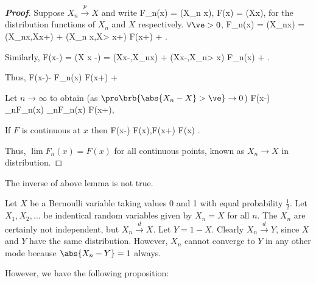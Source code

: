 \begin{proof}[\bf Proof]
Suppose $X_n \stackrel{p}{\to} X$ and write
\be
F_n(x) = \pro(X_n \leq x), \quad\quad F(x) = \pro(X\leq x),
\ee
for the distribution functions of $X_n$ and $X$ respectively. $\forall \ve>0$,
\be
F_n(x) = \pro(X_n\leq x) = \pro(X_n\leq x,X\leq x+\ve) + \pro(X_n \leq x,X> x+\ve) \leq F(x+\ve) + \pro{}.
\ee

Similarly,
\be
F(x-\ve) = \pro(X \leq x -\ve) = \pro(X\leq x-\ve,X_n\leq x) + \pro(X\leq x-\ve,X_n> x) \leq F_n(x) + \pro{}.
\ee

Thus,
\be
F(x-\ve)- \pro{} \leq F_n(x) \leq F(x+\ve) + \pro{}
\ee

Let $n\to \infty$ to obtain (as $\pro\brb{\abs{X_n -X}>\ve}\to 0$)
\be
F(x-\ve) \leq \liminf_{n\to \infty }F_n(x) \leq \limsup_{n\to \infty }F_n(x) \leq F(x+\ve),
\ee

If $F$ is continuous at $x$ then
\be
F(x-\ve) \ua F(x),\quad\quad F(x+\ve) \da F(x) \quad{}\ve {}.
\ee

Thus, $\lim F_n(x) = F(x)$ for all continuous points, known as $X_n \to X$ in distribution.
\end{proof}

\begin{remark}
The inverse of above lemma is not true.
\end{remark}

\begin{example}
Let $X$ be a Bernoulli variable taking values 0 and 1 with equal probability $\frac 12$. Let $X_1,X_2,\dots$ be indentical random variables given by $X_n= X$ for all $n$. The $X_n$ are certainly not independent, but $X_n \stackrel{d}{\to} X$. Let $Y=1-X$. Clearly $X_n \stackrel{d}{\to} Y$, since $X$ and $Y$ have the same distribution. However, $X_n$ cannot converge to $Y$ in any other mode because $\abs{X_n - Y} =1$ always.
\end{example}

However, we have the following proposition:


